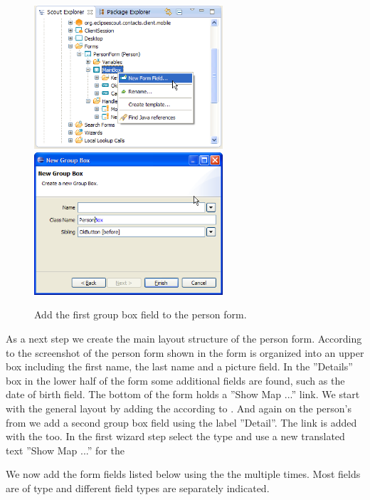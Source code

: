 \documentclass[a4paper,10pt,twoside]{book}
\begin{document}
\begin{figure}
\includegraphics[width=7cm]{new_field_personbox.png} \hspace{5mm}
\includegraphics[width=7cm]{new_field_personbox_name.png}
\caption{Add the first group box field to the person form.}
\end{figure}

As a next step we create the main layout structure of the person form. 
According to the screenshot of the person form shown in  the form is organized into an upper box including the first name, the last name and a picture field. 
In the ''Details'' box in the lower half of the form some additional fields are found, such as the date of birth field. 
The bottom of the form holds a ''Show Map ...'' link.
We start with the general layout by adding the  according to . 
And again on the person's from  we add a second group box field using the label ''Detail''. 
The link is added with the  too. 
In the first wizard step select the type  and use a new translated text ''Show Map ...'' for the 

We now add the form fields listed below using the the  multiple times. 
Most fields are of type  and different field types are separately indicated. 
\end{document}
